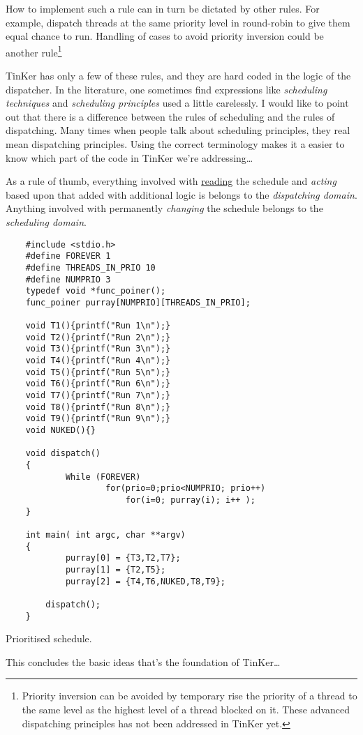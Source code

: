 How to implement such a rule can in turn be dictated by other rules. For example, dispatch threads at the same priority level in round-robin to give them equal chance to run. Handling of cases to avoid priority inversion could be another rule\footnote{Priority inversion can be avoided by temporary rise the priority of a thread to the same level as the highest level of a thread blocked on it. These advanced dispatching principles has not been addressed in TinKer yet.} 

TinKer has only a few of these rules, and they are hard coded in the logic of the dispatcher. In the literature, one sometimes find expressions like \textit{scheduling techniques} and \textit{scheduling principles} used a little carelessly. I would like to point out that there is a difference between the rules of scheduling and the rules of dispatching. Many times when people talk about scheduling principles, they real mean dispatching principles. Using the correct terminology makes it a easier to know which part of the code in TinKer we're addressing\ldots

As a rule of thumb, everything involved with \underline{reading} the schedule and \textit{acting} based upon that added with additional logic is belongs to the \textit{dispatching domain}. Anything involved with permanently \textit{changing} the schedule belongs to the \textit{scheduling domain}.


	\begin{table}[!hbp]
	\begin{verbatim}
	#include <stdio.h>
	#define FOREVER 1
	#define THREADS_IN_PRIO 10
	#define NUMPRIO 3
	typedef void *func_poiner();
	func_poiner purray[NUMPRIO][THREADS_IN_PRIO];

	void T1(){printf("Run 1\n");}
	void T2(){printf("Run 2\n");}
	void T3(){printf("Run 3\n");}
	void T4(){printf("Run 4\n");}
	void T5(){printf("Run 5\n");}
	void T6(){printf("Run 6\n");}
	void T7(){printf("Run 7\n");}
	void T8(){printf("Run 8\n");}
	void T9(){printf("Run 9\n");}
	void NUKED(){}

	void dispatch()
	{
	        While (FOREVER)
	                for(prio=0;prio<NUMPRIO; prio++)
	                	for(i=0; purray(i); i++ );
	}

	int main( int argc, char **argv)
	{
	        purray[0] = {T3,T2,T7};
	        purray[1] = {T2,T5};
	        purray[2] = {T4,T6,NUKED,T8,T9};

		dispatch();
	}
	\end{verbatim}
	\caption{Prioritised schedule.\label{schedued2}}
	\end{table}
	This concludes the basic ideas that's the foundation of TinKer\ldots

